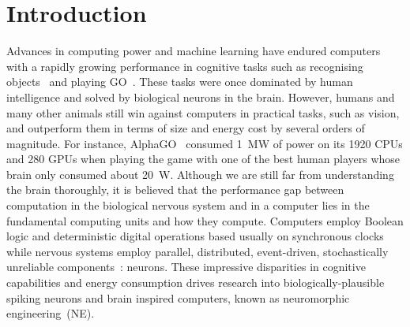 \chapter{Introduction}
\label{cha:intro}
Advances in computing power and machine learning have endured computers with a rapidly growing performance in cognitive tasks such as recognising objects~\cite{deng2009imagenet} and playing GO~\cite{silver2016mastering}. 
These tasks were once dominated by human intelligence and solved by biological neurons in the brain.
However, humans and many other animals still win against computers in practical tasks, such as vision, and outperform them in terms of size and energy cost by several orders of magnitude.
For instance, AlphaGO~\cite{silver2016mastering} consumed 1~MW of power on its 1920 CPUs and 280 GPUs when playing the game with one of the best human players whose brain only consumed about 20~W.
Although we are still far from understanding the brain thoroughly, it is believed that the performance gap between computation in the biological nervous system and in a computer lies in the fundamental computing units and how they compute.
Computers employ Boolean logic and deterministic digital operations based usually on synchronous clocks while nervous systems employ parallel, distributed, event-driven, stochastically unreliable components~\cite{indiveri2009artificial}: neurons.
These impressive disparities in cognitive capabilities and energy consumption drives research into biologically-plausible spiking neurons and brain inspired computers, known as neuromorphic engineering~(NE).

